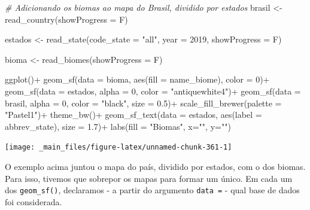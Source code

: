 \documentclass[
  brazilian,
]{book}
\newenvironment{Shaded}{\begin{snugshade}}{\end{snugshade}}
\newcommand{\AttributeTok}[1]{\textcolor[rgb]{0.77,0.63,0.00}{#1}}
\newcommand{\CommentTok}[1]{\textcolor[rgb]{0.56,0.35,0.01}{\textit{#1}}}
\newcommand{\DecValTok}[1]{\textcolor[rgb]{0.00,0.00,0.81}{#1}}
\newcommand{\FloatTok}[1]{\textcolor[rgb]{0.00,0.00,0.81}{#1}}
\newcommand{\FunctionTok}[1]{\textcolor[rgb]{0.00,0.00,0.00}{#1}}
\newcommand{\NormalTok}[1]{#1}
\newcommand{\OtherTok}[1]{\textcolor[rgb]{0.56,0.35,0.01}{#1}}
\newcommand{\SpecialCharTok}[1]{\textcolor[rgb]{0.00,0.00,0.00}{#1}}
\newcommand{\StringTok}[1]{\textcolor[rgb]{0.31,0.60,0.02}{#1}}
\begin{document}
\begin{Shaded}
\begin{Highlighting}[]
\CommentTok{\# Adicionando os biomas ao mapa do Brasil, dividido por estados}
\NormalTok{brasil }\OtherTok{\textless{}{-}} \FunctionTok{read\_country}\NormalTok{(}\AttributeTok{showProgress =}\NormalTok{ F)}

\NormalTok{estados }\OtherTok{\textless{}{-}} \FunctionTok{read\_state}\NormalTok{(}\AttributeTok{code\_state =} \StringTok{"all"}\NormalTok{,}
                      \AttributeTok{year =} \DecValTok{2019}\NormalTok{,}
                      \AttributeTok{showProgress =}\NormalTok{ F)}

\NormalTok{bioma }\OtherTok{\textless{}{-}} \FunctionTok{read\_biomes}\NormalTok{(}\AttributeTok{showProgress =}\NormalTok{ F)}

\FunctionTok{ggplot}\NormalTok{()}\SpecialCharTok{+}
  \FunctionTok{geom\_sf}\NormalTok{(}\AttributeTok{data =}\NormalTok{ bioma, }\FunctionTok{aes}\NormalTok{(}\AttributeTok{fill =}\NormalTok{ name\_biome), }\AttributeTok{color =} \DecValTok{0}\NormalTok{)}\SpecialCharTok{+}
  \FunctionTok{geom\_sf}\NormalTok{(}\AttributeTok{data =}\NormalTok{ estados, }\AttributeTok{alpha =} \DecValTok{0}\NormalTok{, }\AttributeTok{color =} \StringTok{"antiquewhite4"}\NormalTok{)}\SpecialCharTok{+}
  \FunctionTok{geom\_sf}\NormalTok{(}\AttributeTok{data =}\NormalTok{ brasil, }\AttributeTok{alpha =} \DecValTok{0}\NormalTok{, }\AttributeTok{color =} \StringTok{"black"}\NormalTok{, }\AttributeTok{size =} \FloatTok{0.5}\NormalTok{)}\SpecialCharTok{+}
  \FunctionTok{scale\_fill\_brewer}\NormalTok{(}\AttributeTok{palette =} \StringTok{"Pastel1"}\NormalTok{)}\SpecialCharTok{+}
  \FunctionTok{theme\_bw}\NormalTok{()}\SpecialCharTok{+}
  \FunctionTok{geom\_sf\_text}\NormalTok{(}\AttributeTok{data =}\NormalTok{ estados, }\FunctionTok{aes}\NormalTok{(}\AttributeTok{label =}\NormalTok{ abbrev\_state), }\AttributeTok{size =} \FloatTok{1.7}\NormalTok{)}\SpecialCharTok{+}
  \FunctionTok{labs}\NormalTok{(}\AttributeTok{fill =} \StringTok{"Biomas"}\NormalTok{, }\AttributeTok{x=}\StringTok{""}\NormalTok{, }\AttributeTok{y=}\StringTok{""}\NormalTok{)}
\end{Highlighting}
\end{Shaded}

\begin{center}\texttt{[image: \_main\_files/figure-latex/unnamed-chunk-361-1]} \end{center}

O exemplo acima juntou o mapa do país, dividido por estados, com o dos biomas. Para isso, tivemos que sobrepor os mapas para formar um único. Em cada um dos \texttt{geom\_sf()}, declaramos - a partir do argumento \texttt{data\ =} - qual base de dados foi considerada.
\end{document}

